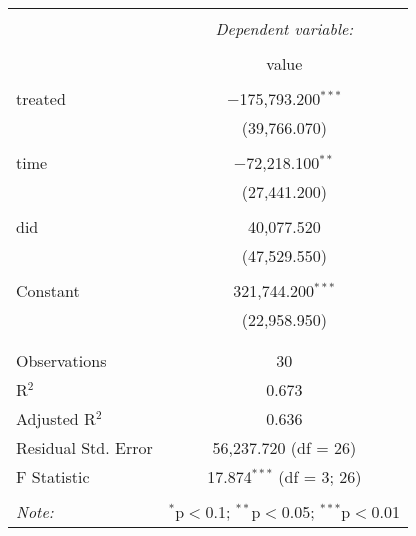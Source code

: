 
\begin{table}[!htbp] \centering 
  \caption{} 
  \label{} 
\begin{tabular}{@{\extracolsep{5pt}}lc} 
\\[-1.8ex]\hline 
\hline \\[-1.8ex] 
 & \multicolumn{1}{c}{\textit{Dependent variable:}} \\ 
\cline{2-2} 
\\[-1.8ex] & value \\ 
\hline \\[-1.8ex] 
 treated & $-$175,793.200$^{***}$ \\ 
  & (39,766.070) \\ 
  & \\ 
 time & $-$72,218.100$^{**}$ \\ 
  & (27,441.200) \\ 
  & \\ 
 did & 40,077.520 \\ 
  & (47,529.550) \\ 
  & \\ 
 Constant & 321,744.200$^{***}$ \\ 
  & (22,958.950) \\ 
  & \\ 
\hline \\[-1.8ex] 
Observations & 30 \\ 
R$^{2}$ & 0.673 \\ 
Adjusted R$^{2}$ & 0.636 \\ 
Residual Std. Error & 56,237.720 (df = 26) \\ 
F Statistic & 17.874$^{***}$ (df = 3; 26) \\ 
\hline 
\hline \\[-1.8ex] 
\textit{Note:}  & \multicolumn{1}{r}{$^{*}$p$<$0.1; $^{**}$p$<$0.05; $^{***}$p$<$0.01} \\ 
\end{tabular} 
\end{table} 

